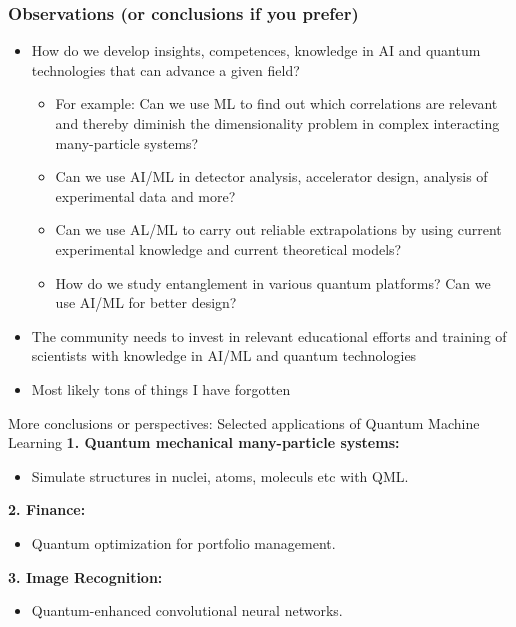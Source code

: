 \documentclass{beamer}
\begin{document}
\begin{frame}
\frametitle{Observations (or conclusions if you prefer)}


\begin{block}{}
\begin{itemize}
\item How do we develop insights, competences, knowledge in AI and quantum technologies  that can advance a given field?
\begin{itemize}

  \item For example: Can we use ML to find out which correlations are relevant and thereby diminish the dimensionality problem in complex interacting  many-particle systems?

  \item Can we use AI/ML in detector analysis, accelerator design, analysis of experimental data and more?

  \item Can we use AL/ML to carry out reliable extrapolations by using current experimental knowledge and current theoretical models?
\item How do we study entanglement in various quantum platforms? Can we use AI/ML for better design?

\end{itemize}

\noindent
\item The community needs to invest in relevant educational efforts and training of scientists with knowledge in AI/ML and quantum technologies

\item Most likely tons of things I have forgotten
\end{itemize}

\noindent
\end{block}
\end{frame}

\begin{frame}{More conclusions or perspectives: Selected applications of Quantum Machine Learning}
\textbf{1. Quantum mechanical many-particle systems:}
\begin{itemize}
    \item Simulate  structures in nuclei, atoms, moleculs etc with QML.
\end{itemize}

\textbf{2. Finance:}
\begin{itemize}
    \item Quantum optimization for portfolio management.
\end{itemize}

\textbf{3. Image Recognition:}
\begin{itemize}
    \item Quantum-enhanced convolutional neural networks.
\end{itemize}
\end{frame}
\end{document}
